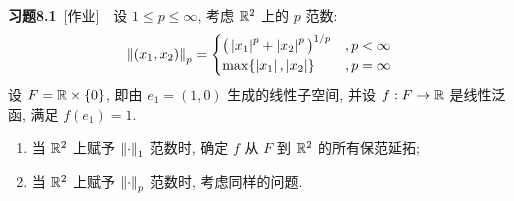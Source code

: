	\textbf{习题8.1}\ [作业]\ \ 设 $ 1\leqslant p\leqslant\infty $, 考虑 $ \mathbb{R}^{2} $ 上的 $ p $ 范数:
	\[
		\left\| (x_{1}, x_{2}) \right\|_{p}=
		\begin{cases}
			\big( \left| x_{1} \right| ^{p}+\left| x_{2} \right| ^{p} \big)^{1/p} & ,p<\infty\\
			\max\{\left| x_{1} \right| , \left| x_{2} \right| \} & ,p = \infty
		\end{cases}
	\]
	设 $ F=\mathbb{R}\times\{ 0 \} $, 即由 $ e_{1}=(1, 0) $ 生成的线性子空间, 并设 $ f:F\to\mathbb{R} $ 是线性泛函, 满足 $ f(e_{1})=1 $.
	\begin{enumerate}[(1)]
		\item 当 $ \mathbb{R}^{2} $ 上赋予 $ \left\| \cdot \right\|_{1} $ 范数时, 确定 $ f $ 从 $ F $ 到 $ \mathbb{R}^{2} $ 的所有保范延拓;
		\item 当 $ \mathbb{R}^{2} $ 上赋予 $ \left\| \cdot \right\|_{p} $ 范数时, 考虑同样的问题.
	\end{enumerate}
